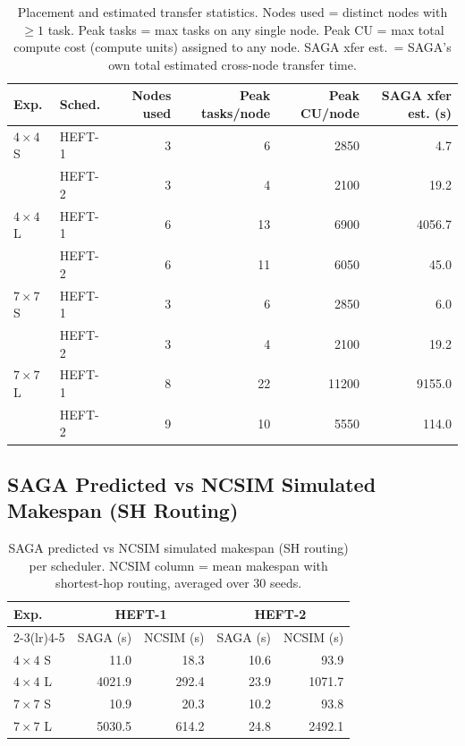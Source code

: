 \documentclass[11pt]{article}
\begin{document}
\begin{table}[H]
\centering
\small
\setlength{\tabcolsep}{4pt}
\begin{tabular}{l l r r r r}
\toprule
\textbf{Exp.} & \textbf{Sched.}
  & \textbf{Nodes used} & \textbf{Peak tasks/node}
  & \textbf{Peak CU/node} & \textbf{SAGA xfer est. (s)} \\
\midrule
  $4\times4$ S & HEFT-1 & 3 & 6 & 2850 & 4.7 \\
   & HEFT-2 & 3 & 4 & 2100 & 19.2 \\
  \midrule
  $4\times4$ L & HEFT-1 & 6 & 13 & 6900 & 4056.7 \\
   & HEFT-2 & 6 & 11 & 6050 & 45.0 \\
  \midrule
  $7\times7$ S & HEFT-1 & 3 & 6 & 2850 & 6.0 \\
   & HEFT-2 & 3 & 4 & 2100 & 19.2 \\
  \midrule
  $7\times7$ L & HEFT-1 & 8 & 22 & 11200 & 9155.0 \\
   & HEFT-2 & 9 & 10 & 5550 & 114.0 \\
  \bottomrule
\end{tabular}
\caption{Placement and estimated transfer statistics.
Nodes used = distinct nodes with $\geq 1$ task.
Peak tasks = max tasks on any single node.
Peak CU = max total compute cost (compute units) assigned to any node.
SAGA xfer est.\ = SAGA's own total estimated cross-node transfer time.}
\end{table}

\subsection{SAGA Predicted vs NCSIM Simulated Makespan (SH Routing)}

\begin{table}[H]
\centering
\small
\setlength{\tabcolsep}{4pt}
\begin{tabular}{l r r r r}
\toprule
\textbf{Exp.}
  & \multicolumn{2}{c}{\textbf{HEFT-1}}
  & \multicolumn{2}{c}{\textbf{HEFT-2}} \\
\cmidrule(lr){2-3}\cmidrule(lr){4-5}
  & SAGA (s) & NCSIM (s) & SAGA (s) & NCSIM (s) \\
\midrule
  $4\times4$ S & 11.0 & 18.3 & 10.6 & 93.9 \\
  $4\times4$ L & 4021.9 & 292.4 & 23.9 & 1071.7 \\
  $7\times7$ S & 10.9 & 20.3 & 10.2 & 93.8 \\
  $7\times7$ L & 5030.5 & 614.2 & 24.8 & 2492.1 \\
\bottomrule
\end{tabular}
\caption{SAGA predicted vs NCSIM simulated makespan (SH routing) per scheduler.
NCSIM column = mean makespan with shortest-hop routing, averaged over 30 seeds.}
\end{table}
\end{document}
